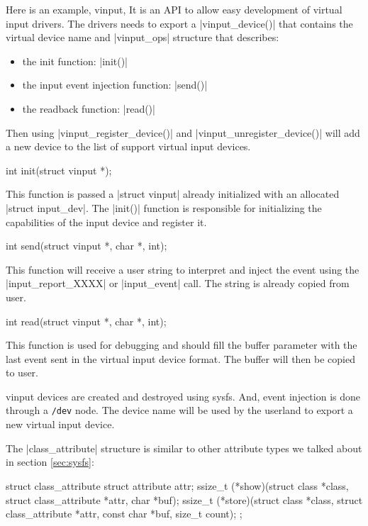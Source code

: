 \documentclass[10pt, oneside]{book}
\begin{document}
Here is an example, vinput,
It is an API to allow easy development of virtual input drivers.
The drivers needs to export a \cpp|vinput_device()| that contains the virtual device name and \cpp|vinput_ops| structure that describes:

\begin{itemize}
    \item the init function: \cpp|init()|
    \item the input event injection function: \cpp|send()|
    \item the readback function: \cpp|read()|
\end{itemize}

Then using \cpp|vinput_register_device()| and \cpp|vinput_unregister_device()| will add a new device to the list of support virtual input devices.

\begin{code}
int init(struct vinput *);
\end{code}

This function is passed a \cpp|struct vinput| already initialized with an allocated \cpp|struct input_dev|.
The \cpp|init()| function is responsible for initializing the capabilities of the input device and register it.

\begin{code}
int send(struct vinput *, char *, int);
\end{code}

This function will receive a user string to interpret and inject the event using the \cpp|input_report_XXXX| or \cpp|input_event| call.
The string is already copied from user.

\begin{code}
int read(struct vinput *, char *, int);
\end{code}

This function is used for debugging and should fill the buffer parameter with the last event sent in the virtual input device format.
The buffer will then be copied to user.

vinput devices are created and destroyed using sysfs.
And, event injection is done through a \verb|/dev| node.
The device name will be used by the userland to export a new virtual input device.

The \cpp|class_attribute| structure is similar to other attribute types we talked about in section \ref{sec:sysfs}:

\begin{code}
struct class_attribute {
    struct attribute attr;
    ssize_t (*show)(struct class *class, struct class_attribute *attr,
                    char *buf);
    ssize_t (*store)(struct class *class, struct class_attribute *attr,
                    const char *buf, size_t count);
};
\end{code}
\end{document}
